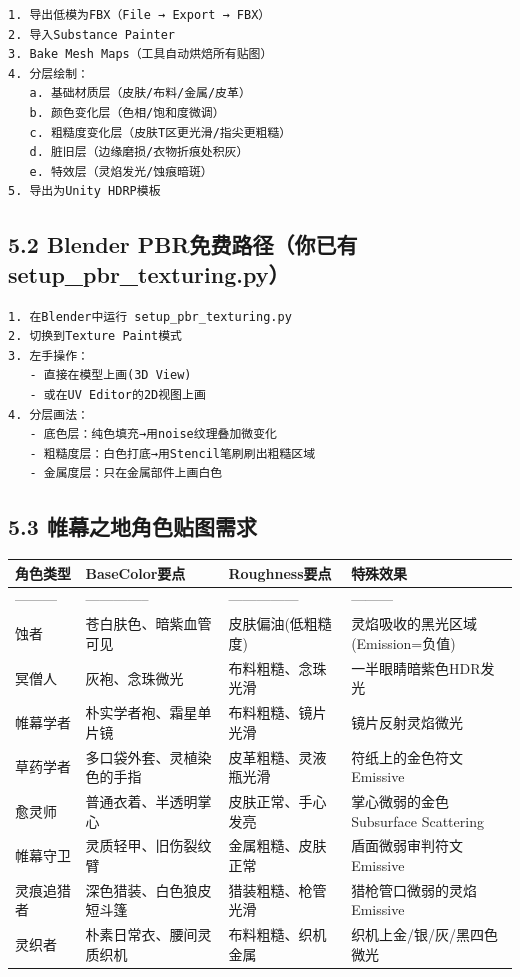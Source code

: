 \documentclass[12pt,a4paper,openany]{ctexbook}
\begin{document}
\begin{verbatim}
1. 导出低模为FBX（File → Export → FBX）
2. 导入Substance Painter
3. Bake Mesh Maps（工具自动烘焙所有贴图）
4. 分层绘制：
   a. 基础材质层（皮肤/布料/金属/皮革）
   b. 颜色变化层（色相/饱和度微调）
   c. 粗糙度变化层（皮肤T区更光滑/指尖更粗糙）
   d. 脏旧层（边缘磨损/衣物折痕处积灰）
   e. 特效层（灵焰发光/蚀痕暗斑）
5. 导出为Unity HDRP模板
\end{verbatim}


\subsection*{5.2 Blender PBR免费路径（你已有setup\_pbr\_texturing.py）}


\begin{verbatim}
1. 在Blender中运行 setup_pbr_texturing.py
2. 切换到Texture Paint模式
3. 左手操作：
   - 直接在模型上画(3D View)
   - 或在UV Editor的2D视图上画
4. 分层画法：
   - 底色层：纯色填充→用noise纹理叠加微变化
   - 粗糙度层：白色打底→用Stencil笔刷刷出粗糙区域
   - 金属度层：只在金属部件上画白色
\end{verbatim}


\subsection*{5.3 帷幕之地角色贴图需求}


\begin{tabular}{|l|l|l|l|}
\hline
角色类型 & BaseColor要点 & Roughness要点 & 特殊效果 \\
\hline
--------- & -------------- & --------------- & --------- \\
蚀者 & 苍白肤色、暗紫血管可见 & 皮肤偏油(低粗糙度) & 灵焰吸收的黑光区域(Emission=负值) \\
冥僧人 & 灰袍、念珠微光 & 布料粗糙、念珠光滑 & 一半眼睛暗紫色HDR发光 \\
帷幕学者 & 朴实学者袍、霜星单片镜 & 布料粗糙、镜片光滑 & 镜片反射灵焰微光 \\
草药学者 & 多口袋外套、灵植染色的手指 & 皮革粗糙、灵液瓶光滑 & 符纸上的金色符文Emissive \\
愈灵师 & 普通衣着、半透明掌心 & 皮肤正常、手心发亮 & 掌心微弱的金色Subsurface Scattering \\
帷幕守卫 & 灵质轻甲、旧伤裂纹臂 & 金属粗糙、皮肤正常 & 盾面微弱审判符文Emissive \\
灵痕追猎者 & 深色猎装、白色狼皮短斗篷 & 猎装粗糙、枪管光滑 & 猎枪管口微弱的灵焰Emissive \\
灵织者 & 朴素日常衣、腰间灵质织机 & 布料粗糙、织机金属 & 织机上金/银/灰/黑四色微光 \\
\hline
\end{tabular}
\end{document}
